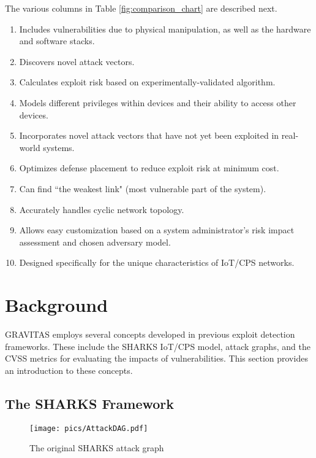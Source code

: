 \documentclass[10pt,journal,compsoc]{IEEEtran}
\begin{document}
\small{The various columns in Table \ref{fig:comparison_chart} are described next.
\begin{enumerate}
    \item Includes vulnerabilities due to physical manipulation, as well as the hardware and software stacks.
    \item Discovers novel attack vectors.
    \item Calculates exploit risk based on experimentally-validated algorithm.
    \item Models different privileges within devices and their ability to access other devices.
    \item Incorporates novel attack vectors that have not yet been exploited in real-world systems.
    \item Optimizes defense placement to reduce exploit risk at minimum cost.
    \item Can find ``the weakest link" (most vulnerable part of the system).
    \item Accurately handles cyclic network topology.
    \item Allows easy customization based on a system administrator's risk impact assessment and chosen adversary model.
    \item Designed specifically for the unique characteristics of IoT/CPS networks.
    
\end{enumerate}}


\section{Background}
\label{section:Background}

GRAVITAS employs several concepts developed in previous exploit detection frameworks. These include the SHARKS IoT/CPS model, attack graphs, and the CVSS metrics for evaluating the impacts of vulnerabilities. This section 
provides an introduction to these concepts.

\subsection{The SHARKS Framework}

\begin{figure*}[t]
\centering
\texttt{[image: pics/AttackDAG.pdf]}
\caption{The original SHARKS attack graph \cite{saha2020}} 
\label{fig:AttackDAG}
\end{figure*}
\end{document}
